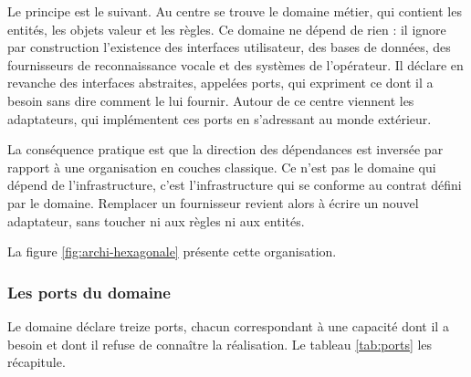 Le principe est le suivant. Au centre se trouve le domaine métier, qui contient les entités, les objets valeur et les règles. Ce domaine ne dépend de rien : il ignore par construction l'existence des interfaces utilisateur, des bases de données, des fournisseurs de reconnaissance vocale et des systèmes de l'opérateur. Il déclare en revanche des interfaces abstraites, appelées ports, qui expriment ce dont il a besoin sans dire comment le lui fournir. Autour de ce centre viennent les adaptateurs, qui implémentent ces ports en s'adressant au monde extérieur.

La conséquence pratique est que la direction des dépendances est inversée par rapport à une organisation en couches classique. Ce n'est pas le domaine qui dépend de l'infrastructure, c'est l'infrastructure qui se conforme au contrat défini par le domaine. Remplacer un fournisseur revient alors à écrire un nouvel adaptateur, sans toucher ni aux règles ni aux entités.

La figure \ref{fig:archi-hexagonale} présente cette organisation.


\subsubsection{Les ports du domaine}

Le domaine déclare treize ports, chacun correspondant à une capacité dont il a besoin et dont il refuse de connaître la réalisation. Le tableau \ref{tab:ports} les récapitule.


